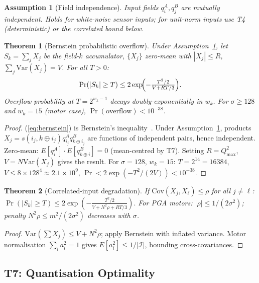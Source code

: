 \documentclass[11pt,a4paper]{article}
\theoremstyle{definition}
\theoremstyle{plain}
\newtheorem{theorem}{Theorem}[section]
\newtheorem{assumption}{Assumption}[section]
\theoremstyle{remark}
\newcommand{\Var}{\mathrm{Var}}
\newcommand{\Cov}{\mathrm{Cov}}
\begin{document}
\begin{assumption}[Field independence]
\label{ass:independence}
Input fields $q_i^A, q_j^B$ are mutually independent.
Holds for white-noise sensor inputs; for unit-norm inputs use T4
(deterministic) or the correlated bound below.
\end{assumption}

\begin{theorem}[Bernstein probabilistic overflow]
\label{thm:prob}
Under Assumption~\ref{ass:independence}, let $S_k=\sum_j X_j$ be the
field-$k$ accumulator, $\{X_j\}$ zero-mean with $|X_j|\le R$,
$\sum_j\Var(X_j)=V$.
For all $T>0$:
\begin{equation}\label{eq:bernstein}
  \Pr(|S_k|\ge T)\le2\exp\!\Bigl(-\tfrac{T^2/2}{V+RT/3}\Bigr).
\end{equation}
Overflow probability at $T=2^{w_k-1}$ decays doubly-exponentially in $w_k$.
For $\sigma\ge128$ and $w_k=15$ (motor case),
$\Pr(\text{overflow})<10^{-38}$.
\end{theorem}

\begin{proof}
(\ref{eq:bernstein}) is Bernstein's inequality~\cite{boucheron2013}.
Under Assumption~\ref{ass:independence}, products
$X_j=s(i_j,k\oplus i_j)q_{i_j}^Aq_{k\oplus i_j}^B$
are functions of independent pairs, hence independent.
Zero-mean: $E[q_i^A]\cdot E[q_{k\oplus i}^B]=0$ (mean-centred by T7).
Setting $R=Q_{\max}^2$, $V=N\Var(X_j)$ gives the result.
For $\sigma=128$, $w_k=15$: $T=2^{14}=16384$, $V\le8\times128^4\approx2.1\times10^9$,
$\Pr<2\exp(-T^2/(2V))<10^{-38}$.
\end{proof}

\begin{theorem}[Correlated-input degradation]
\label{thm:corr}
If $\Cov(X_j,X_\ell)\le\rho$ for all $j\ne\ell$:
$\Pr(|S_k|\ge T)\le2\exp(-\frac{T^2/2}{V+N^2\rho+RT/3}).$
For PGA motors: $|\rho|\le1/(2\sigma^2)$; penalty $N^2\rho\le m^2/(2\sigma^2)$
decreases with $\sigma$.
\end{theorem}

\begin{proof}
$\Var(\sum X_j)\le V+N^2\rho$; apply Bernstein with inflated variance.
Motor normalisation $\sum_i a_i^2=1$ gives $E[a_i^2]\le1/|\mathcal{I}|$,
bounding cross-covariances.
\end{proof}

\subsection{T7: Quantisation Optimality}
\label{sec:quant}
\end{document}
